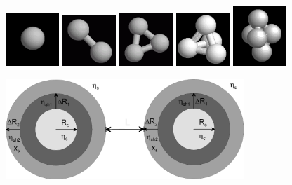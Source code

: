 \begin{figure}[htb]
\begin{center}
\includegraphics[width=0.18\textwidth]{../images/form_factor/cluster/tetrahedron1.png}
\includegraphics[width=0.18\textwidth]{../images/form_factor/cluster/tetrahedron2.png}
\includegraphics[width=0.18\textwidth]{../images/form_factor/cluster/tetrahedron3.png}
\includegraphics[width=0.18\textwidth]{../images/form_factor/cluster/tetrahedron4.png}
\includegraphics[width=0.18\textwidth]{../images/form_factor/cluster/tetrahedron5.png}
\end{center}
\caption{} \label{tetrahedron}
\end{figure}
\begin{figure}[htb]
\begin{center}
\includegraphics[width=0.8\textwidth]{../images/form_factor/cluster/l_doubleshell.png}
\end{center}
\caption{}
\label{TetrahedronDoubleShell}
\end{figure}

